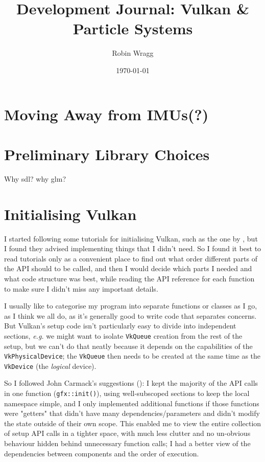 \documentclass[11pt, a4paper, twocolumn]{article}
\title{\sffamily\bfseries Development Journal: Vulkan \& Particle Systems}
\author{Robin Wragg}
\date{\today}
\begin{document}
\maketitle

\section{Moving Away from IMUs(?)}

\section{Preliminary Library Choices}

Why sdl? why glm?

\section{Initialising Vulkan}

I started following some tutorials for initialising Vulkan, such as the one by \citet{Overvoorde2019}, but I found they advised implementing things that I didn't need. So I found it best to read tutorials only as a convenient place to find out what order different parts of the API should to be called, and then I would decide which parts I needed and what code structure was best, while reading the API reference \citep{VulkanSpec} for each function to make sure I didn't miss any important details.

I usually like to categorise my program into separate functions or classes as I go, as I think we all do, as it's generally good to write code that separates concerns. But Vulkan's setup code isn't particularly easy to divide into independent sections, \emph{e.g.} we might want to isolate \verb|VkQueue| creation from the rest of the setup, but we can't do that neatly because it depends on the capabilities of the \verb|VkPhysicalDevice|; the \verb|VkQueue| then needs to be created at the same time as the \verb|VkDevice| (the \emph{logical} device).

So I followed John Carmack's suggestions (\citeyear{Carmack2007}): I kept the majority of the API calls in one function (\verb|gfx::init()|), using well-subscoped sections to keep the local namespace simple, and I only implemented additional functions if those functions were "getters" that didn't have many dependencies/parameters and didn't modify the state outside of their own scope. This enabled me to view the entire collection of setup API calls in a tighter space, with much less clutter and no un-obvious behaviour hidden behind unnecessary function calls; I had a better view of the dependencies between components and the order of execution.
\end{document}
